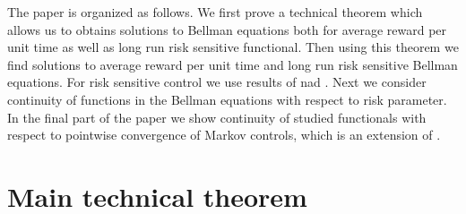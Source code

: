 \documentclass[10pt,english]{extarticle}
\begin{document}
The paper is organized as follows. We first prove a technical theorem which allows us to obtains solutions to Bellman equations both for average reward per unit time as well as long run risk sensitive functional.   Then using this theorem we find solutions to average reward per unit time and long run risk sensitive Bellman equations. For risk sensitive control we use results of \cite{DiMasi  1999} nad \cite{Ste2023}. Next we consider continuity of functions in the Bellman equations with respect to risk parameter. In the final part of the paper we show continuity of studied functionals with respect to pointwise convergence of Markov controls,  which is an extension of \cite{Ste2024}. 
   
\section{Main technical theorem}
\end{document}

